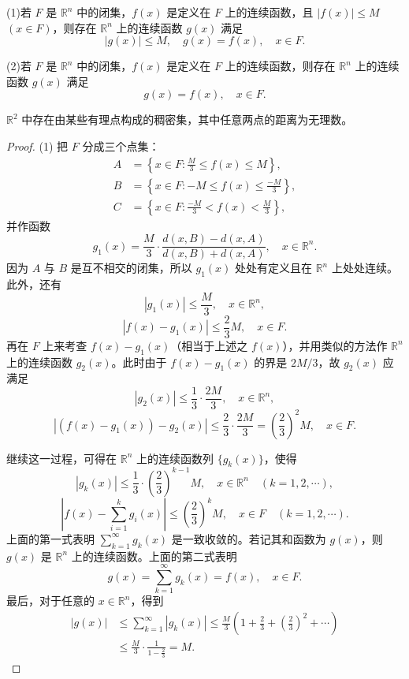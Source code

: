 \documentclass[../../main.tex]{subfiles}%
\begin{document}
\begin{theorem}[连续延拓定理]\label{theorem:连续函数延拓定理}
(1)若 \(F\) 是 \(\mathbb{R}^n\) 中的闭集，\(f(x)\) 是定义在 \(F\) 上的连续函数，且 \(|f(x)|\leqslant M\) \((x\in F)\)，则存在 \(\mathbb{R}^n\) 上的连续函数 \(g(x)\) 满足
\[
|g(x)|\leqslant M, \quad g(x)=f(x), \quad x\in F.
\]

(2)若 \(F\) 是 \(\mathbb{R}^n\) 中的闭集，\(f(x)\) 是定义在 \(F\) 上的连续函数，则存在 \(\mathbb{R}^n\) 上的连续函数 \(g(x)\) 满足
\[
g(x)=f(x), \quad x\in F.
\]
\end{theorem}
\begin{remark}
\(\mathbb{R}^2\) 中存在由某些有理点构成的稠密集，其中任意两点的距离为无理数。 
\end{remark}
\begin{proof}

(1) 把 \(F\) 分成三个点集：
\begin{align*}
A&=\left\{x\in F:\frac{M}{3}\leqslant f(x)\leqslant M\right\},\\
B&=\left\{x\in F:-M\leqslant f(x)\leqslant\frac{-M}{3}\right\},\\
C&=\left\{x\in F:\frac{-M}{3}<f(x)<\frac{M}{3}\right\},
\end{align*}
并作函数
\[
g_1(x)=\frac{M}{3}\cdot\frac{d(x,B)-d(x,A)}{d(x,B)+d(x,A)}, \quad x\in\mathbb{R}^n.
\]
因为 \(A\) 与 \(B\) 是互不相交的闭集，所以 \(g_1(x)\) 处处有定义且在 \(\mathbb{R}^n\) 上处处连续。此外，还有
\[
|g_1(x)|\leqslant\frac{M}{3}, \quad x\in\mathbb{R}^n,
\]
\[
|f(x)-g_1(x)|\leqslant\frac{2}{3}M, \quad x\in F.
\]
再在 \(F\) 上来考查 \(f(x)-g_1(x)\)（相当于上述之 \(f(x)\)），并用类似的方法作 \(\mathbb{R}^n\) 上的连续函数 \(g_2(x)\)。此时由于 \(f(x)-g_1(x)\) 的界是 \(2M/3\)，故 \(g_2(x)\) 应满足
\[
|g_2(x)|\leqslant\frac{1}{3}\cdot\frac{2M}{3}, \quad x\in\mathbb{R}^n,
\]
\[
|(f(x)-g_1(x))-g_2(x)|\leqslant\frac{2}{3}\cdot\frac{2M}{3}=\left(\frac{2}{3}\right)^2M, \quad x\in F.
\]

继续这一过程，可得在 \(\mathbb{R}^n\) 上的连续函数列 \(\{g_k(x)\}\)，使得
\[
|g_k(x)|\leqslant\frac{1}{3}\cdot\left(\frac{2}{3}\right)^{k - 1}M, \quad x\in\mathbb{R}^n \quad (k = 1,2,\cdots),
\]
\[
\left|f(x)-\sum_{i = 1}^{k}g_i(x)\right|\leqslant\left(\frac{2}{3}\right)^kM, \quad x\in F \quad (k = 1,2,\cdots).
\]
上面的第一式表明 \(\sum_{k = 1}^{\infty}g_k(x)\) 是一致收敛的。若记其和函数为 \(g(x)\)，则 \(g(x)\) 是 \(\mathbb{R}^n\) 上的连续函数。上面的第二式表明
\[
g(x)=\sum_{k = 1}^{\infty}g_k(x)=f(x), \quad x\in F.
\]
最后，对于任意的 \(x\in\mathbb{R}^n\)，得到
\begin{align*}
|g(x)|&\leqslant\sum_{k = 1}^{\infty}|g_k(x)|\leqslant\frac{M}{3}\left(1+\frac{2}{3}+\left(\frac{2}{3}\right)^2+\cdots\right)\\
&\leqslant\frac{M}{3}\cdot\frac{1}{1 - \frac{2}{3}}=M.
\end{align*}


\end{proof}
\end{document}
